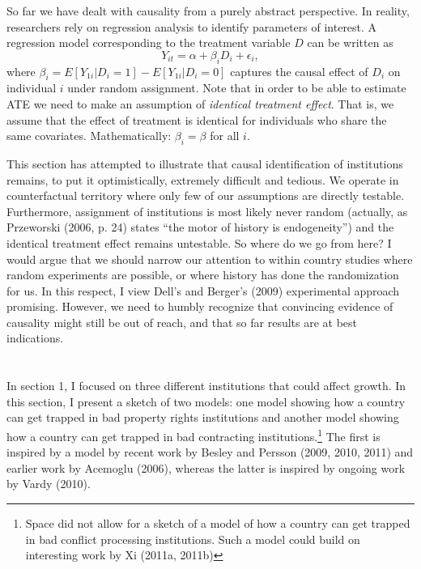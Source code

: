 \documentclass[12pt]{article}%
\begin{document}
So far we have dealt with causality from a purely abstract perspective. In reality, researchers rely on regression analysis to identify parameters of interest. A regression model corresponding to the treatment variable $D$ can be written as
\begin{equation}
Y_{it}=\alpha+\beta_iD_i+\epsilon_i,
\end{equation}
where $\beta_i=E[Y_{1i}|D_i=1]-E[Y_{1i}|D_i=0]$ captures the causal effect of $D_i$ on individual $i$ under random assignment. Note that in order to be able to estimate ATE we need to make an assumption of \textit{identical treatment effect}. That is, we assume that the effect of treatment is identical for individuals who share the same covariates. Mathematically: $\beta_i=\beta$ for all $i$. 

This section has attempted to illustrate that causal identification of institutions remains, to put it optimistically, extremely difficult and tedious. We operate in counterfactual territory where only few of our assumptions are directly testable. Furthermore, assignment of institutions is most likely never random (actually, as Przeworski (2006, p. 24) states ``the motor of history is endogeneity'') and the identical treatment effect remains untestable. So where do we go from here? I would argue that we should narrow our attention to within country studies where random experiments are possible, or where history has done the randomization for us. In this respect, I view Dell's and Berger's (2009) experimental approach promising. However, we need to humbly recognize that convincing evidence of causality might still be out of reach, and that so far results are at best indications. 

\section{}
In section 1, I focused on three different institutions that could affect growth. In this section, I present a sketch of two models: one model showing how a country can get trapped in bad property rights institutions and another model showing how a country can get trapped in bad contracting institutions.\footnote{Space did not allow for a sketch of a model of how a country can get trapped in bad conflict processing institutions. Such a model could build on interesting work by Xi (2011a, 2011b)} The first is inspired by a model by recent work by Besley and Persson (2009, 2010, 2011) and earlier work by Acemoglu (2006), whereas the latter is inspired by ongoing work by Vardy (2010). 
\end{document}
